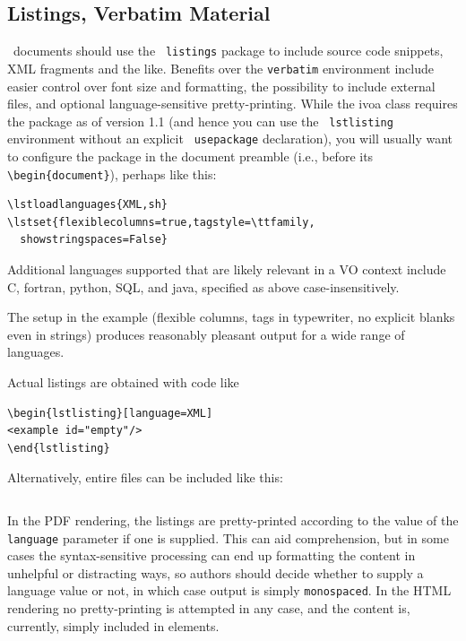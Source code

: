 \documentclass[11pt,a4paper]{ivoa}
\newcommand{\texword}[1]{\texttt{\color{texcolor} #1}}
\begin{document}
\subsection{Listings, Verbatim Material}
\label{sect:verbatim}

\ivoatex\ documents should use the \texword{listings} package to include
source code snippets, XML fragments and the like.
Benefits over the \verb|verbatim| environment include easier control over
font size and formatting, the possibility to include external files,
and optional language-sensitive pretty-printing.
While the ivoa class
requires the package as of version 1.1 (and hence you can use the
\texword{lstlisting} environment without an explicit
\texword{usepackage} declaration), you will usually want to configure
the package in the document preamble (i.e., before its
\verb|\begin{document}|), perhaps like this:

\begin{lstlisting}
\lstloadlanguages{XML,sh}
\lstset{flexiblecolumns=true,tagstyle=\ttfamily,
  showstringspaces=False}
\end{lstlisting}

Additional
languages supported that are likely relevant in a VO context include C,
fortran, python, SQL, and java, specified as above case-insensitively.

The setup in the example (flexible columns, tags in
typewriter, no explicit blanks even in strings) 
produces reasonably pleasant output for a wide range of languages.

Actual listings are obtained with code like
\begin{verbatim}
\begin{lstlisting}[language=XML]
<example id="empty"/>
\end{lstlisting}
\end{verbatim}
Alternatively, entire files can be included like this:
\begin{verbatim}

\end{verbatim}
In the PDF rendering, the listings are pretty-printed
according to the value of the \verb|language| parameter if one is supplied.
This can aid comprehension, but in some cases the syntax-sensitive
processing can end up formatting the content in
unhelpful or distracting ways,
so authors should decide whether to supply a language value
or not, in which case output is simply \verb|monospaced|.
In the HTML rendering no pretty-printing is attempted in any case,
and the content is, currently, simply included in  elements.
\end{document}
